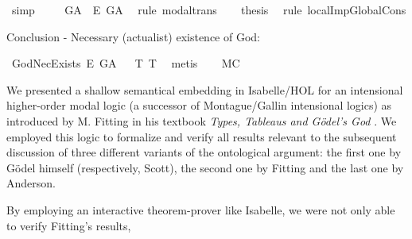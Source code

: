 \begin{isabellebody}
\ simp\isanewline
\ \ \isamarkupfalse%
\ {\isachardoublequoteopen}{\isasymlfloor}\isactrlbold {\isasymdiamond}\isactrlbold {\isasymexists}\ G\isactrlsup A\ \isactrlbold {\isasymrightarrow}\ \isactrlbold {\isasymbox}\isactrlbold {\isasymexists}\isactrlsup E\ G\isactrlsup A{\isasymrfloor}{\isachardoublequoteclose}\ \isamarkupfalse%
\ {\isacharparenleft}rule\ modal{\isacharunderscore}trans{\isacharparenright}\isanewline
\ \ \isamarkupfalse%
\ {\isacharquery}thesis\ \isamarkupfalse%
\ {\isacharparenleft}rule\ localImpGlobalCons{\isacharparenright}\isanewline
{}\isamarkupfalse%
%
%
%
%
\begin{isamarkuptext}%
Conclusion - Necessary (actualist) existence of God:%
\end{isamarkuptext}\isamarkuptrue%
\isamarkupfalse%
\ GodNecExists{\isacharcolon}\ {\isachardoublequoteopen}{\isasymlfloor}\isactrlbold {\isasymbox}\isactrlbold {\isasymexists}\isactrlsup E\ G\isactrlsup A{\isasymrfloor}{\isachardoublequoteclose}%
\ %
%
\isamarkupfalse%
\ T{}\ T{}\ \isamarkupfalse%
\ metis%
%
%
\ \ \isanewline
{}\isamarkupfalse%
\ MC{\isacharcolon}\ {\isachardoublequoteopen}{\isasymlfloor}\isactrlbold {\isasymforall}{\isasymPhi}{\isachardot}{\isacharparenleft}{\isasymPhi}\ \isactrlbold {\isasymrightarrow}\ {\isacharparenleft}\isactrlbold {\isasymbox}\ {\isasymPhi}{\isacharparenright}{\isacharparenright}{\isasymrfloor}{\isachardoublequoteclose}\ \isamarkupfalse%
%
\ %
%
\isamarkupfalse%
\ %
%
%
%
%
\isamarkuptrue%
%
\begin{isamarkuptext}%
We presented a shallow semantical embedding in Isabelle/HOL for an intensional higher-order modal logic
(a successor of Montague/Gallin intensional logics) as introduced by M. Fitting in his textbook \emph{Types, Tableaus and 
G\"odel's God} \cite{Fitting}. 
We employed this logic to formalize and verify all results relevant to the subsequent discussion of three different
variants of the ontological argument: the first one by G\"odel himself (respectively, Scott), the second 
one by Fitting and the last one by Anderson.%
\end{isamarkuptext}\isamarkuptrue%
%
\begin{isamarkuptext}%
By employing an interactive theorem-prover like Isabelle, we were not only able to verify Fitting's results,

\end{isamarkuptext}
\end{isabellebody}
